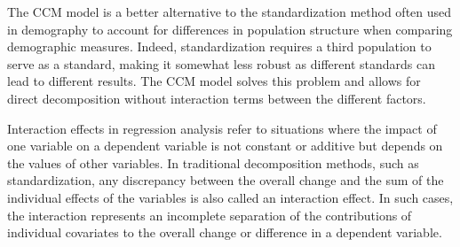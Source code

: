   \vspace{0.7em}\par
  The CCM model is a better alternative to the standardization method often used in demography to account for differences in population structure when comparing demographic measures. Indeed, standardization requires a third population to serve as a standard, making it somewhat less robust as different standards can lead to different results. The CCM model solves this problem and allows for direct decomposition without interaction terms between the different factors.
  
  Interaction effects in regression analysis refer to situations where the impact of one variable on a dependent variable is not constant or additive but depends on the values of other variables. In traditional decomposition methods, such as standardization, any discrepancy between the overall change and the sum of the individual effects of the variables is also called an interaction effect. In such cases, the interaction represents an incomplete separation of the contributions of individual covariates to the overall change or difference in a dependent variable.
